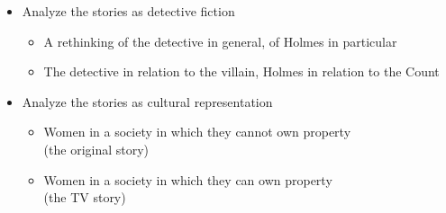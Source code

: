 \documentclass[a4paper,landscape,headrule,footrule,xetex]{foils}
\begin{document}

% 

\begin{itemize}
\item Analyze the stories as detective fiction
  \begin{itemize}
  \item A rethinking of the detective in general, of Holmes
in particular
\item The detective in relation to the villain, Holmes in
relation to the Count
\end{itemize}
\item Analyze the stories as cultural representation
  \begin{itemize}
  \item Women in a society in which they cannot own
property \\ (the original story)
\item Women in a society in which they can own
property \\ (the TV story)
\end{itemize}


\end{itemize}
\end{document}
